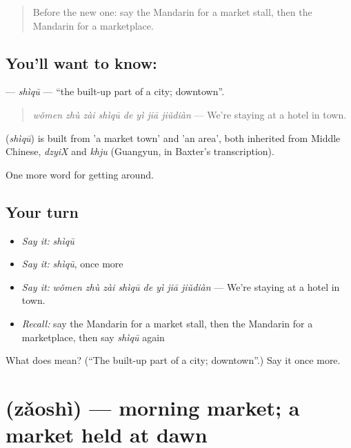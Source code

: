 \begin{quote}
Before the new one: say the Mandarin for a market stall, then the Mandarin for a marketplace.
\end{quote}

\subsection*{You'll want to know: }
\textbf{} — \emph{shìqū} — \textquotedblleft{}the built-up part of a city; downtown\textquotedblright{}.

\begin{quote}
\emph{wǒmen zhù zài shìqū de yì jiā jiǔdiàn} — We're staying at a hotel in town.
\end{quote}

\begin{cousinweb}
\textbf{} (\emph{shìqū}) is built from  'a market town' and  'an area', both inherited from Middle Chinese, \emph{dzyiX} and \emph{khju} (Guangyun, in Baxter's transcription).
\end{cousinweb}

\begin{grammarlens}[title={What you've built}]
One more word for getting around.
\end{grammarlens}

\subsection*{Your turn}
\begin{itemize}
\raggedright
  \item \emph{Say it:} \emph{shìqū}
  \item \emph{Say it:} \emph{shìqū}, once more
  \item \emph{Say it:} \emph{wǒmen zhù zài shìqū de yì jiā jiǔdiàn} — We're staying at a hotel in town.
  \item \emph{Recall:} say the Mandarin for a market stall, then the Mandarin for a marketplace, then say \emph{shìqū} again
\end{itemize}

\begin{tcolorbox}[breakable,colback=teal!4,colframe=teal!35!black,title={Before you move on}]
What does  mean? (\textquotedblleft{}The built-up part of a city; downtown\textquotedblright{}.) Say it once more.
\end{tcolorbox}
\section[\texorpdfstring{\zh{早市} (zǎoshì)}{早市 (zǎoshì)}]{ (zǎoshì) — morning market; a market held at dawn}

